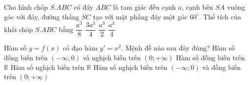 \begin{ex}%
	Cho hình chóp $S.ABC$ có đáy $ABC$ là tam giác đều cạnh $a$, cạnh bên $SA$ vuông góc với đáy, đường thẳng $SC$ tạo với mặt phẳng đáy một góc $60^\circ$. Thể tích của khối chóp $S.ABC$ bằng
	\choice
	{$\dfrac{a^3}{8}$}
	{$\dfrac{3a^3}{4}$}
	{$\dfrac{a^3}{2}$}
	{\True $\dfrac{a^3}{4}$}
\end{ex}
\begin{ex}%
	Hàm số $y = f(x)$ có đạo hàm $y' = x^2$. Mệnh đề nào sau đây đúng?
	\choice
	{Hàm số đồng biến trên $\left(-\infty;0\right)$ và nghịch biến trên $\left(0;+\infty\right)$}
	{\True Hàm số đồng biến trên $\mathbb{R}$}
	{Hàm số nghịch biến trên $\mathbb{R}$}
	{Hàm số nghịch biến trên $\left(-\infty;0\right)$ và đồng biến trên $\left(0;+\infty\right)$}
\end{ex}

